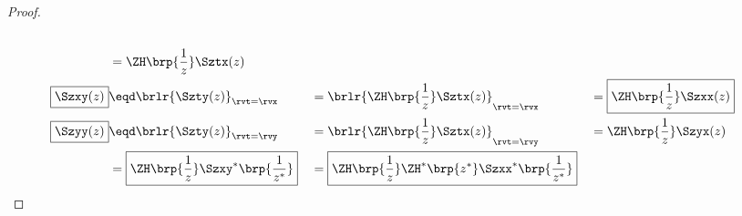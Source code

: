 \begin{proof}
\begin{align*}
    \\&= \ZH\brp{\frac{1}{z}} \Sztx(z)
    \\
    \boxed{\Szxy(z)}
      &\eqd \brlr{\Szty(z)}_{\rvt=\rvx}
     &&= \brlr{\ZH\brp{\frac{1}{z}} \Sztx(z)}_{\rvt=\rvx}
     &&= \boxed{\ZH\brp{\frac{1}{z}} \Szxx(z)}
    \\
    \boxed{\Szyy(z)}
      &\eqd \brlr{\Szty(z)}_{\rvt=\rvy}
     &&= \brlr{\ZH\brp{\frac{1}{z}} \Sztx(z)}_{\rvt=\rvy}
     &&= \ZH\brp{\frac{1}{z}} \Szyx(z)
    \\&= \boxed{\ZH\brp{\frac{1}{z}} \Szxy^\ast\brp{\frac{1}{z^\ast}}}
     &&= \boxed{\ZH\brp{\frac{1}{z}} \ZH^\ast\brp{z^\ast} \Szxx^\ast\brp{\frac{1}{z^\ast}}}
  \end{align*}
\end{proof}


